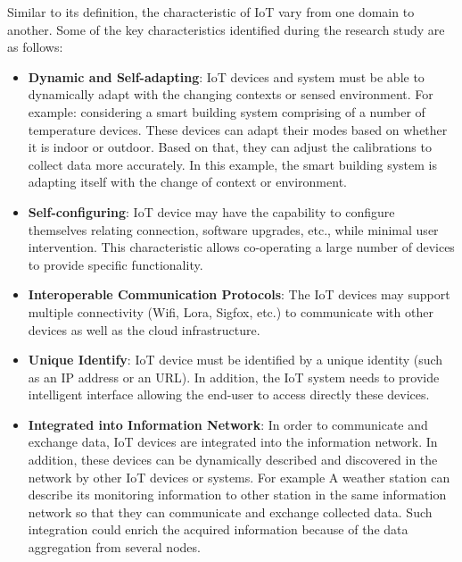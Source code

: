 Similar to its definition, the characteristic of IoT vary from one domain to another. Some of the key characteristics identified during the research study are as follows:
\begin{itemize}
    \item \textbf{Dynamic and Self-adapting}: IoT devices and system must be able to dynamically adapt with the changing contexts or sensed environment. For example: considering a smart building system comprising of a number of temperature devices. These devices can adapt their modes based on whether it is indoor or outdoor. Based on that, they can adjust the calibrations to collect data more accurately. In this example, the smart building system is adapting itself with the change of context or environment.
    
    \item \textbf{Self-configuring}: IoT device may have the capability to configure themselves relating connection, software upgrades, etc., while minimal user intervention.  This characteristic allows co-operating a large number of devices to provide specific functionality.
    
    \item \textbf{Interoperable Communication Protocols}: The IoT devices may support multiple connectivity (Wifi, Lora, Sigfox, etc.) to communicate with other devices as well as the cloud infrastructure.
    
    \item \textbf{Unique Identify}: IoT device must be identified by a unique identity (such as an IP address or an URL). In addition, the IoT system needs to provide intelligent interface allowing the end-user to access directly these devices.
    
    \item \textbf{Integrated into Information Network}: In order to communicate and exchange data, IoT devices are integrated into the information network. In addition, these devices can be dynamically described and discovered in the network by other IoT devices or systems. For example A weather station can describe its monitoring information to other station in the same information network so that they can communicate and exchange collected data. Such integration could enrich the acquired information because of the data aggregation from several nodes.
    
\end{itemize}

